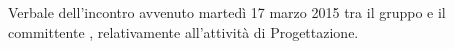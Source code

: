 Verbale dell'incontro avvenuto martedì 17 marzo 2015 tra il gruppo \gruppo e il committente \committenteAlt, relativamente all'attività di Progettazione.
